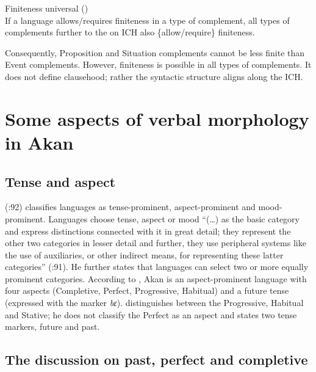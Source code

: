 \documentclass[output=paper]{langscibook}
\begin{document}
\begin{exe}
\ex \label{Paj7} Finiteness universal (\citealt{wurmbrandetal2020}) \\ 
If a language {allows/requires} finiteness in a type of complement, all types of complements further to the  on ICH also \{allow/require\} finiteness.
\end{exe}


Consequently, Proposition and Situation complements cannot be less finite than Event complements. However, finiteness is possible in all types of complements. It does not define clausehood; rather the syntactic structure aligns along the ICH.  

\section{Some aspects of verbal morphology in Akan}\label{Pajsect:2}

\subsection{Tense and aspect}

\citeauthor{bhat1999} (\citeyear{bhat1999}:92) classifies languages as tense-prominent, aspect-prominent and mood-prominent. Languages choose tense, aspect or mood “(…) as the basic category and express distinctions connected with it in great detail; they represent the other two categories in lesser detail and further, they use peripheral systems like the use of auxiliaries, or other indirect means, for representing these latter categories” (\citealt{bhat1999}:91). He further states that languages can select two or more equally prominent categories. According to \citet{osam2008}, Akan is an aspect-prominent language with four aspects (Completive, Perfect, Progressive, Habitual) and a future tense (expressed with the marker \emph{bɛ}). \citet{boadi2008} distinguishes between the Progressive, Habitual and Stative; he does not classify the Perfect as an aspect and states two tense markers, future and past.

\subsection{The discussion on past, perfect and completive}
\end{document}
